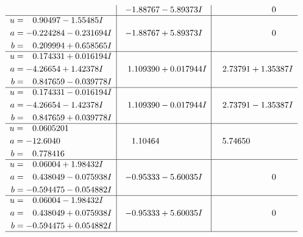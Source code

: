 \documentclass[1p]{elsarticle_modified}
\theoremstyle{definition}
\begin{document}
$$\begin{array}{c|c|c}
 & -1.88767 - 5.89373 I & \phantom{-0.000000 } 0 \\ \hline\begin{aligned}
u &= \phantom{-}0.90497 - 1.55485 I \\
a &= -0.224284 - 0.231694 I \\
b &= \phantom{-}0.209994 + 0.658565 I\end{aligned}
 & -1.88767 + 5.89373 I & \phantom{-0.000000 } 0 \\ \hline\begin{aligned}
u &= \phantom{-}0.174331 + 0.016194 I \\
a &= -4.26654 + 1.42378 I \\
b &= \phantom{-}0.847659 - 0.039778 I\end{aligned}
 & \phantom{-}1.109390 + 0.017944 I & \phantom{-}2.73791 + 1.35387 I \\ \hline\begin{aligned}
u &= \phantom{-}0.174331 - 0.016194 I \\
a &= -4.26654 - 1.42378 I \\
b &= \phantom{-}0.847659 + 0.039778 I\end{aligned}
 & \phantom{-}1.109390 - 0.017944 I & \phantom{-}2.73791 - 1.35387 I \\ \hline\begin{aligned}
u &= \phantom{-}0.0605201\phantom{ +0.000000I} \\
a &= -12.6040\phantom{ +0.000000I} \\
b &= \phantom{-}0.778416\phantom{ +0.000000I}\end{aligned}
 & \phantom{-}1.10464\phantom{ +0.000000I} & \phantom{-}5.74650\phantom{ +0.000000I} \\ \hline\begin{aligned}
u &= \phantom{-}0.06004 + 1.98432 I \\
a &= \phantom{-}0.438049 - 0.075938 I \\
b &= -0.594475 - 0.054882 I\end{aligned}
 & -0.95333 - 5.60035 I & \phantom{-0.000000 } 0 \\ \hline\begin{aligned}
u &= \phantom{-}0.06004 - 1.98432 I \\
a &= \phantom{-}0.438049 + 0.075938 I \\
b &= -0.594475 + 0.054882 I\end{aligned}
 & -0.95333 + 5.60035 I & \phantom{-0.000000 } 0\\
 \hline 
 \end{array}$$\newpage\newpage\renewcommand{\arraystretch}{1}
\end{document}
